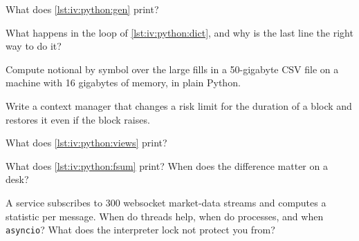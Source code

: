 \begin{interviewq}\label{iq:iv:python:4}
What does \cref{lst:iv:python:gen} print?
\end{interviewq}

\label{lst:iv:python:dict}

\begin{interviewq}\label{iq:iv:python:5}
What happens in the loop of \cref{lst:iv:python:dict}, and why is the last line the right way to do it?
\end{interviewq}

\begin{interviewq}\label{iq:iv:python:6}
Compute notional by symbol over the large fills in a 50-gigabyte CSV file on a machine with 16 gigabytes of memory, in plain
Python.
\end{interviewq}

\begin{interviewq}\label{iq:iv:python:7}
Write a context manager that changes a risk limit for the duration of a block and restores it even if the block raises.
\end{interviewq}

\label{lst:iv:python:views}

\begin{interviewq}\label{iq:iv:python:8}
What does \cref{lst:iv:python:views} print?
\end{interviewq}

\label{lst:iv:python:fsum}

\begin{interviewq}\label{iq:iv:python:9}
What does \cref{lst:iv:python:fsum} print? When does the difference matter on a desk?
\end{interviewq}

\begin{interviewq}\label{iq:iv:python:10}
A service subscribes to 300 websocket market-data streams and computes a statistic per message. When do threads help, when
do processes, and when \texttt{asyncio}? What does the interpreter lock not protect you from?
\end{interviewq}

